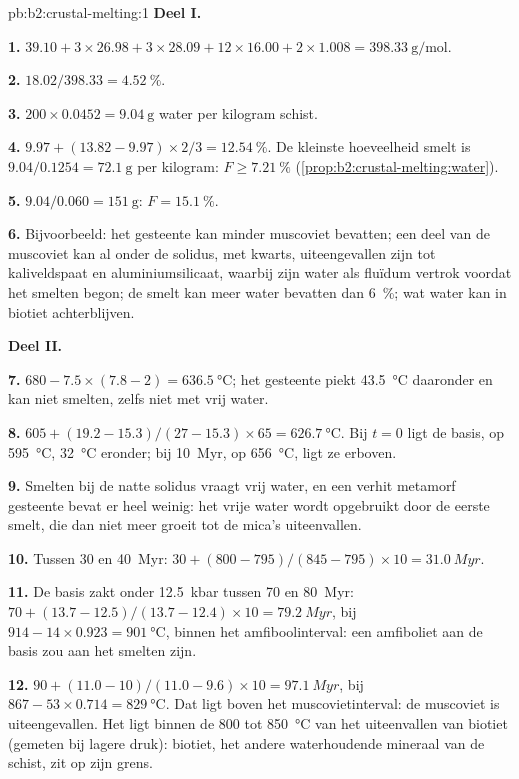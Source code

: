 \begin{solution}{pb:b2:crustal-melting:1}
\noindent\textbf{Deel I.}

\textbf{1.} $39.10 + 3\times26.98 + 3\times28.09 + 12\times16.00 + 2\times1.008 =
\qty{398.33}{\gram\per\mole}$.

\textbf{2.} $18.02/398.33 = \qty{4.52}{\percent}$.

\textbf{3.} $200\times0.0452 = \qty{9.04}{\gram}$ water per kilogram schist.

\textbf{4.} $9.97 + (13.82 - 9.97)\times2/3 = \qty{12.54}{\percent}$. De kleinste hoeveelheid smelt is
$9.04/0.1254 = \qty{72.1}{\gram}$ per kilogram: $F \ge \qty{7.21}{\percent}$
(\cref{prop:b2:crustal-melting:water}).

\textbf{5.} $9.04/0.060 = \qty{151}{\gram}$: $F = \qty{15.1}{\percent}$.

\textbf{6.} Bijvoorbeeld: het gesteente kan minder muscoviet bevatten; een deel van de muscoviet kan
al onder de solidus, met kwarts, uiteengevallen zijn tot kaliveldspaat en
aluminiumsilicaat, waarbij zijn water als fluïdum vertrok voordat het smelten begon; de smelt kan meer
water bevatten dan \qty{6}{\percent}; wat water kan in biotiet achterblijven.

\noindent\textbf{Deel II.}

\textbf{7.} $680 - 7.5\times(7.8 - 2) = \qty{636.5}{\celsius}$; het gesteente piekt
\qty{43.5}{\celsius} daaronder en kan niet smelten, zelfs niet met vrij water.

\textbf{8.} $605 + (19.2 - 15.3)/(27 - 15.3)\times65 = \qty{626.7}{\celsius}$. Bij
$t = 0$ ligt de basis, op \qty{595}{\celsius}, \qty{32}{\celsius} eronder; bij
\qty{10}{Myr}, op \qty{656}{\celsius}, ligt ze erboven.

\textbf{9.} Smelten bij de natte solidus vraagt vrij water, en een verhit metamorf gesteente
bevat er heel weinig: het vrije water wordt opgebruikt door de eerste smelt, die dan niet meer groeit
tot de mica's uiteenvallen.

\textbf{10.} Tussen 30 en \qty{40}{Myr}: $30 + (800 - 795)/(845 - 795)\times10 =
\qty{31.0}{Myr}$.

\textbf{11.} De basis zakt onder \qty{12.5}{kbar} tussen 70 en \qty{80}{Myr}:
$70 + (13.7 - 12.5)/(13.7 - 12.4)\times10 = \qty{79.2}{Myr}$, bij
$914 - 14\times0.923 = \qty{901}{\celsius}$, binnen het amfiboolinterval: een amfiboliet
aan de basis zou aan het smelten zijn.

\textbf{12.} $90 + (11.0 - 10)/(11.0 - 9.6)\times10 = \qty{97.1}{Myr}$, bij $867 -
53\times0.714 = \qty{829}{\celsius}$. Dat ligt boven het muscovietinterval: de muscoviet
is uiteengevallen. Het ligt binnen de 800 tot \qty{850}{\celsius} van het uiteenvallen van biotiet
(gemeten bij lagere druk): biotiet, het andere waterhoudende mineraal van de schist, zit op zijn
grens.


\end{solution}
